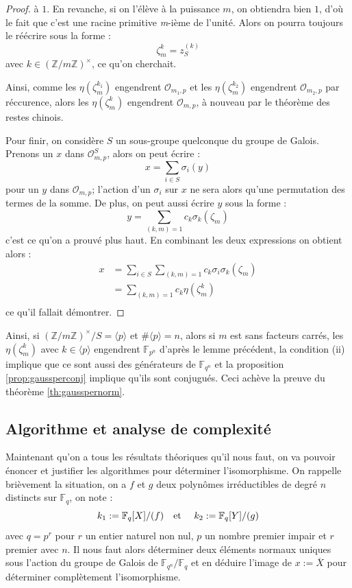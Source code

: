 \documentclass[a4paper]{article} %
\numberwithin{section}{part}
\numberwithin{equation}{section}
\newcommand\nroot[1]{\textit{#1}-ième}
\newcommand\zmodninv[1]{(\mathbb{Z}/#1\mathbb{Z})^{\times}}
\newcommand\GF[1]{\mathbb{F}_{#1}}
\newcommand\EO{\mathcal{O}}
\newcommand\etmath{\textup{\quad et \quad}}
\newcommand\groupgen[1]{\langle{#1}\rangle}
\begin{document}
\begin{proof}
à $1$. En revanche, si on l'élève à la puissance $m$, on obtiendra bien $1$, 
d'où le fait que c'est une racine primitive \nroot{m} de l'unité. Alors on 
pourra toujours le réécrire sous la forme : 
\[\zeta_m^k = z_S^{(k)}\]
avec $k\in\zmodninv{m}$, ce qu'on cherchait.\par
\fi
Ainsi, comme les $\eta(\zeta_m^{k_1})$ engendrent $\EO_{m_1,p}$ et les 
$\eta(\zeta_m^{k_2})$ engendrent $\EO_{m_2,p}$ par réccurence, alors les 
$\eta(\zeta_m^k)$ engendrent $\EO_{m,p}$, à nouveau par le théorème des restes 
chinois.\par
Pour finir, on considère $S$ un sous-groupe quelconque du groupe de Galois. 
Prenons un $x$ dans $\EO_{m,p}^S$, alors on peut écrire :
\begin{equation}
x = \sum_{i\in S}{\sigma_i(y)}
\end{equation}
pour un $y$ dans $\EO_{m,p}$; l'action d'un $\sigma_i$ sur $x$ ne sera alors
qu'une permutation des termes de la somme. De plus, on peut aussi écrire $y$ 
sous la forme :
\begin{equation}
y = \sum_{(k,m)=1}{c_k\sigma_k(\zeta_m)}
\end{equation}
c'est ce qu'on a prouvé plus haut. En combinant les deux expressions on obtient 
alors :
\begin{align*}
x &= \sum_{i\in S}{\sum_{(k,m)=1}{c_k\sigma_i\sigma_k(\zeta_m)}}\\
&= \sum_{(k,m)=1}{c_k\eta(\zeta_m^k)}\\
\end{align*}
ce qu'il fallait démontrer.
\end{proof}

Ainsi, si $\zmodninv{m}/S = \groupgen{p}$ et $\#\groupgen{p} = n$, alors si $m$ 
est sans facteurs carrés, les $\eta(\zeta_m^k)$ avec $k\in\groupgen{p}$ 
engendrent $\GF{p^n}$ d'après le lemme précédent, la condition (ii) implique que
ce sont aussi des générateurs de $\GF{q^n}$ et la proposition 
\ref{prop:gaussperconj} implique qu'ils sont conjugués. Ceci achève la preuve du
théorème \ref{th:gausspernorm}.

\subsection{Algorithme et analyse de complexité}
\label{sec:algcompcycl}
Maintenant qu'on a tous les résultats théoriques qu'il nous faut, on va pouvoir
énoncer et justifier les algorithmes pour déterminer l'isomorphisme. 
On rappelle brièvement la situation, on a $f$ et $g$ deux polynômes 
irréductibles de degré $n$ distincts sur $\GF{q}$, on note :
\[k_1 := \GF{q}[X]/(f)\etmath k_2 := \GF{q}[Y]/(g)\]
avec $q = p^r$ pour $r$ un entier naturel non nul, $p$ un nombre premier
impair et $r$ premier avec $n$. Il nous faut alors déterminer deux éléments 
normaux uniques sous l'action du groupe de Galois de $\GF{q^n}/\GF{q}$ et en 
déduire l'image de $x := \overline{X}$ pour déterminer complètement 
l'isomorphisme. 
\end{document}
